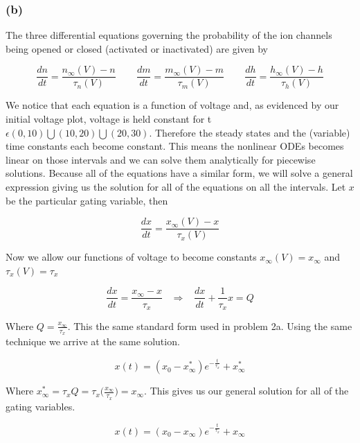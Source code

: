 \documentclass[letterpaper,10pt,english]{/usr/share/sphinx/texinputs/sphinxhowto}
\begin{document}
\subsubsection{(b)}\label{b}

The three differential equations governing the probability of the ion
channels being opened or closed (activated or inactivated) are given by

\[\frac{dn}{dt} = \frac{n_{\infty}(V)-n}{\tau_n(V)} \hspace{25pt} \frac{dm}{dt} = \frac{m_{\infty}(V)-m}{\tau_m(V)} \hspace{25pt} \frac{dh}{dt} = \frac{h_{\infty}(V)-h}{\tau_h(V)}\]

We notice that each equation is a function of voltage and, as evidenced
by our initial voltage plot, voltage is held constant for t
$\epsilon (0,10)\bigcup (10,20) \bigcup (20,30)$. Therefore the steady
states and the (variable) time constants each become constant. This
means the nonlinear ODEs becomes linear on those intervals and we can
solve them analytically for piecewise solutions. Because all of the
equations have a similar form, we will solve a general expression giving
us the solution for all of the equations on all the intervals. Let $x$
be the particular gating variable, then

\[\frac{dx}{dt} = \frac{x_{\infty}(V)-x}{\tau_x(V)}\]

Now we allow our functions of voltage to become constants
$x_{\infty}(V)=x_{\infty}$ and $\tau_x(V)=\tau_x$

\[\frac{dx}{dt} = \frac{x_{\infty}-x}{\tau_x} \hspace{10pt} \Rightarrow \hspace{10pt} \frac{dx}{dt} +\frac{1}{\tau_x}x = Q\]

Where $Q = \frac{x_{\infty}}{\tau_x}$. This the same standard form used
in problem 2a. Using the same technique we arrive at the same solution.

\[x(t) = (x_0-x^*_{\infty})e^{-\frac{t}{\tau_x}}+x^*_{\infty}\]

Where
$x^*_{\infty} = \tau_xQ = \tau_x\big(\frac{x_{\infty}}{\tau_x}\big) = x_{\infty}$.
This gives us our general solution for all of the gating variables.

\[x(t) = (x_0-x_{\infty})e^{-\frac{t}{\tau_x}}+x_{\infty}\]
\end{document}
